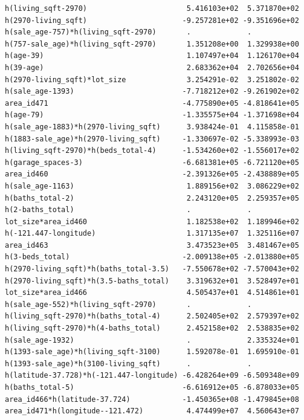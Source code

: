 \documentclass[
]{article}
\begin{document}
\begin{verbatim}
h(living_sqft-2970)                       5.416103e+02  5.371870e+02
h(2970-living_sqft)                      -9.257281e+02 -9.351696e+02
h(sale_age-757)*h(living_sqft-2970)       .             .           
h(757-sale_age)*h(living_sqft-2970)       1.351208e+00  1.329938e+00
h(age-39)                                 1.107497e+04  1.126170e+04
h(39-age)                                 2.683362e+04  2.702656e+04
h(2970-living_sqft)*lot_size              3.254291e-02  3.251802e-02
h(sale_age-1393)                         -7.718212e+02 -9.261902e+02
area_id471                               -4.775890e+05 -4.818641e+05
h(age-79)                                -1.335575e+04 -1.371698e+04
h(sale_age-1883)*h(2970-living_sqft)      3.938424e-01  4.115858e-01
h(1883-sale_age)*h(2970-living_sqft)     -1.330697e-02 -5.338993e-03
h(living_sqft-2970)*h(beds_total-4)      -1.534260e+02 -1.556017e+02
h(garage_spaces-3)                       -6.681381e+05 -6.721120e+05
area_id460                               -2.391326e+05 -2.438889e+05
h(sale_age-1163)                          1.889156e+02  3.086229e+02
h(baths_total-2)                          2.243120e+05  2.259357e+05
h(2-baths_total)                          .             .           
lot_size*area_id460                       1.182538e+02  1.189946e+02
h(-121.447-longitude)                     1.317135e+07  1.325116e+07
area_id463                                3.473523e+05  3.481467e+05
h(3-beds_total)                          -2.009138e+05 -2.013880e+05
h(2970-living_sqft)*h(baths_total-3.5)   -7.550678e+02 -7.570043e+02
h(2970-living_sqft)*h(3.5-baths_total)    3.319632e+01  3.528497e+01
lot_size*area_id466                       4.505437e+01  4.514861e+01
h(sale_age-552)*h(living_sqft-2970)       .             .           
h(living_sqft-2970)*h(baths_total-4)      2.502405e+02  2.579397e+02
h(living_sqft-2970)*h(4-baths_total)      2.452158e+02  2.538835e+02
h(sale_age-1932)                          .             2.335324e+01
h(1393-sale_age)*h(living_sqft-3100)      1.592078e-01  1.695910e-01
h(1393-sale_age)*h(3100-living_sqft)      .             .           
h(latitude-37.728)*h(-121.447-longitude) -6.428264e+09 -6.509348e+09
h(baths_total-5)                         -6.616912e+05 -6.878033e+05
area_id466*h(latitude-37.724)            -1.450365e+08 -1.479845e+08
area_id471*h(longitude--121.472)          4.474499e+07  4.560643e+07
                                                                    

\end{verbatim}
\end{document}
